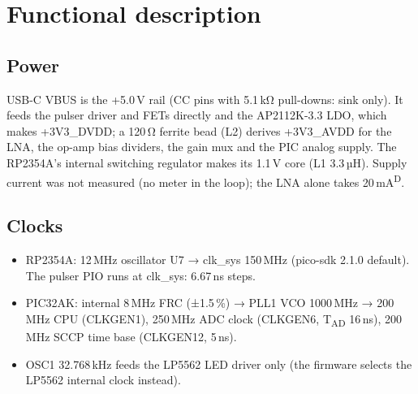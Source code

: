 \documentclass[10pt,a4paper]{article}
\newcommand{\des}{\textsuperscript{D}}
\begin{document}
\section{Functional description}
\subsection{Power}
USB-C VBUS is the +5.0\,V rail (CC pins with 5.1\,kΩ pull-downs: sink only). It feeds the pulser driver and FETs directly and the
AP2112K-3.3 LDO, which makes +3V3\_DVDD; a 120\,Ω ferrite bead (L2) derives +3V3\_AVDD for the LNA, the op-amp bias dividers, the
gain mux and the PIC analog supply. The RP2354A's internal switching regulator makes its 1.1\,V core (L1 3.3\,µH).
Supply current was not measured (no meter in the loop); the LNA alone takes 20\,mA\des.

\subsection{Clocks}
\begin{itemize}
  \item RP2354A: 12\,MHz oscillator U7 → clk\_sys 150\,MHz (pico-sdk 2.1.0 default). The pulser PIO runs at clk\_sys: 6.67\,ns steps.
  \item PIC32AK: internal 8\,MHz FRC (±1.5\,\%) → PLL1 VCO 1000\,MHz → 200\,MHz CPU (CLKGEN1), 250\,MHz ADC clock (CLKGEN6, T\textsubscript{AD} 16\,ns), 200\,MHz SCCP time base (CLKGEN12, 5\,ns).
  \item OSC1 32.768\,kHz feeds the LP5562 LED driver only (the firmware selects the LP5562 internal clock instead).
\end{itemize}
\end{document}
